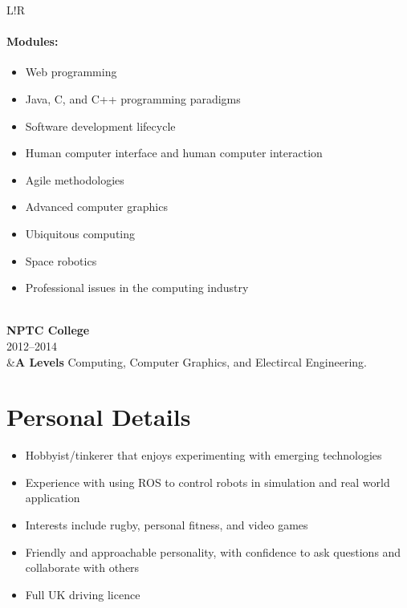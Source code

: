 \documentclass[10pt]{article}
\newcommand\VRule{\color{lightgray}\vrule width 0.5pt}
\begin{document}
\begin{longtable}{L!{\VRule}R}
\vspace{-3mm}
\paragraph{Modules:}
\begin{itemize}[noitemsep,topsep=0pt]
    \item Web programming
    \item Java, C, and C++ programming paradigms
    \item Software development lifecycle
    \item Human computer interface and human computer interaction
    \item Agile methodologies
    \item Advanced computer graphics
    \item Ubiquitous computing
    \item Space robotics
    \item Professional issues in the computing industry
\end{itemize}
\\

{\bf NPTC College}\\
2012--2014\\
&{\bf A Levels}\newline
Computing, Computer Graphics, and Electircal Engineering.

\end{longtable}

\section*{Personal Details}
\begin{itemize}[noitemsep,topsep=0pt]
    \item Hobbyist/tinkerer that enjoys experimenting with emerging technologies
    \item Experience with using ROS to control robots in simulation and real world application
	\item Interests include rugby, personal fitness, and video games
	\item Friendly and approachable personality, with confidence to ask questions and collaborate with others
	\item Full UK driving licence
\end{itemize}
\end{document}
